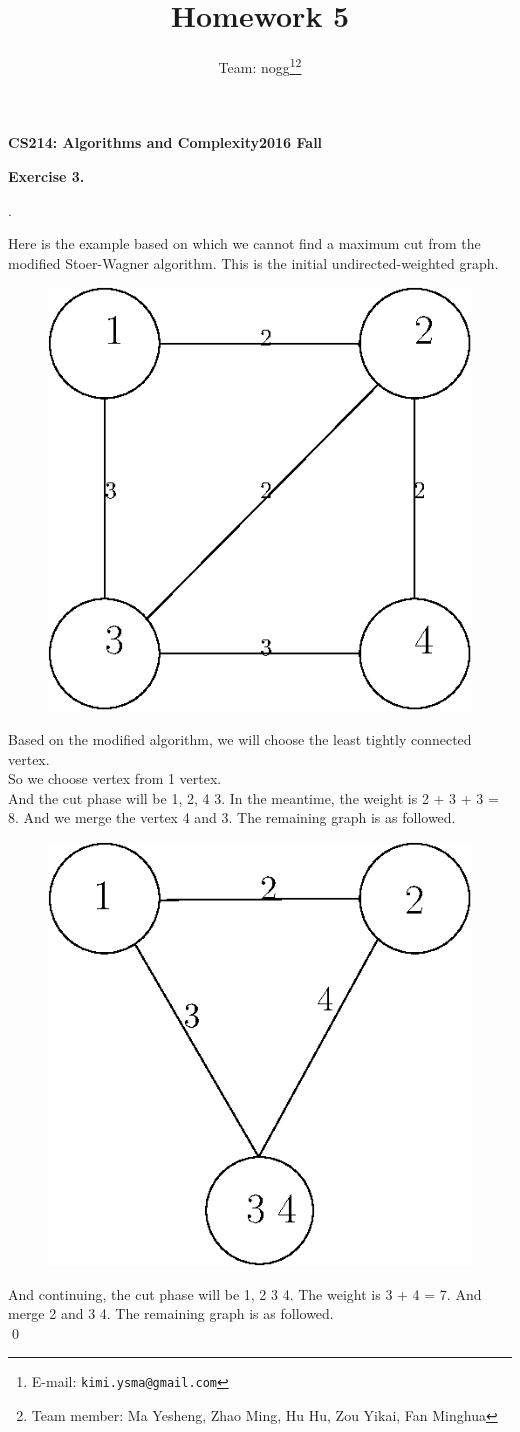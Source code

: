\documentclass[12pt, notitlepage]{article}
\title{Homework 5}
\author{Team: nogg\footnote{E-mail: \texttt{kimi.ysma@gmail.com}}\footnote{Team member: Ma Yesheng, Zhao Ming, Hu Hu, Zou Yikai, Fan Minghua}}
\newenvironment{sol}
  {\par\vspace{3mm}\noindent{\it Solution}.}{\qed}
\begin{document}
{\bf\small CS214: Algorithms and Complexity}\hfill{\bf\small 2016 Fall}
{\let\newpage\relax\maketitle}


\textbf{Exercise 3.}
\begin{sol}

Here is the example based on which we cannot find a maximum cut from the modified Stoer-Wagner algorithm. This is the initial undirected-weighted graph.\\
\begin{figure}[H]
	\centering
	\includegraphics[width=0.4\linewidth]{1.eps}
\end{figure}

Based on the modified algorithm, we will choose the least tightly connected vertex.\\
So we choose vertex from 1 vertex.\\
And the cut phase will be {1, 2, 4} {3}. In the meantime, the weight is 2 + 3 + 3 = 8. And we merge the vertex 4 and 3. The remaining graph is as followed.\\

\begin{figure}[H]
	\centering
	\includegraphics[width=0.4\linewidth]{2.eps}
\end{figure}

And continuing, the cut phase will be {1, 2} {3 4}. The weight is 3 + 4 = 7. And merge 2 and 3 4. The remaining graph is as followed.\\


\end{sol}
\end{document}
